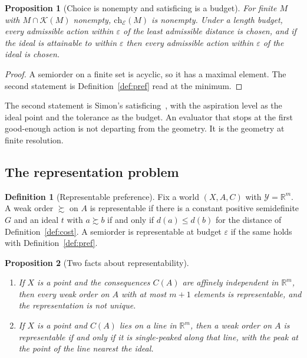 \documentclass[11pt]{article}
\newtheorem{proposition}{Proposition}
\theoremstyle{definition}
\newtheorem{definition}{Definition}
\theoremstyle{remark}
\newcommand{\Ev}{\mathcal{E}}
\newcommand{\K}{\mathcal{K}}
\newcommand{\Y}{\mathcal{Y}}
\newcommand{\R}{\mathbb{R}}
\begin{document}
\begin{proposition}[Choice is nonempty and satisficing is a budget]
\label{prop:choice}
For finite $M$ with $M\cap\K(M)$ nonempty, $\mathrm{ch}_{\Ev}(M)$ is nonempty.
Under a length budget, every admissible action within $\varepsilon$ of the least admissible distance is chosen, and if the ideal is attainable to within $\varepsilon$ then every admissible action within $\varepsilon$ of the ideal is chosen.
\end{proposition}

\begin{proof}
A semiorder on a finite set is acyclic, so it has a maximal element. The second statement is Definition~\ref{def:pref} read at the minimum.
\end{proof}

The second statement is Simon's satisficing~\cite{simon1955}, with the aspiration level as the ideal point and the tolerance as the budget.
An evaluator that stops at the first good-enough action is not departing from the geometry.
It is the geometry at finite resolution.

\subsection{The representation problem}

\begin{definition}[Representable preference]
Fix a world $(X,A,C)$ with $\Y=\R^{m}$.
A weak order $\succsim$ on $A$ is representable if there is a constant positive semidefinite $G$ and an ideal $t$ with $a\succsim b$ if and only if $d(a)\le d(b)$ for the distance of Definition~\ref{def:cost}.
A semiorder is representable at budget $\varepsilon$ if the same holds with Definition~\ref{def:pref}.
\end{definition}

\begin{proposition}[Two facts about representability]
\label{prop:repr}
\begin{enumerate}
\item[(a)] If $X$ is a point and the consequences $C(A)$ are affinely independent in $\R^{m}$, then every weak order on $A$ with at most $m+1$ elements is representable, and the representation is not unique.
\item[(b)] If $X$ is a point and $C(A)$ lies on a line in $\R^{m}$, then a weak order on $A$ is representable if and only if it is single-peaked along that line, with the peak at the point of the line nearest the ideal.
\end{enumerate}
\end{proposition}
\end{document}
